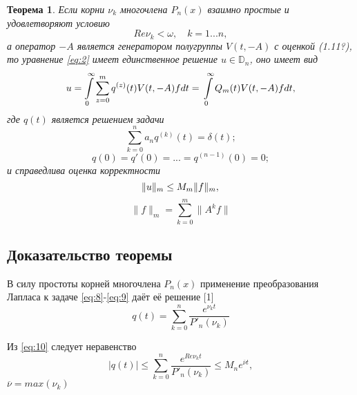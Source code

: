 \documentclass[1244sdpt,a4paper]{article}
\theoremstyle{plain}
\newtheorem{theorem}{Теорема}[section]
\numberwithin{equation}{section}
\begin{document}
\begin{theorem}
    Если корни $\nu_k$ многочлена $P_n(x)$ взаимно простые и удовлетворяют условию
    \begin{equation}
        \label{eq:13}
        Re \nu_k < \omega, \quad k = 1...n,
    \end{equation}
    а оператор $-A$ является генератором полугруппы $V(t, -A)$ с оценкой (1.11?), то уравнение
    \ref{eq:2} имеет единственное решение $u \in \mathbb{D}_n$, оно имеет вид
    \begin{equation}
        u = \int\limits_0^\infty \sum_{z=0}^{m} q^{(z)}(t) V(t, -A) fdt = \\
        \int\limits_0^\infty Q_m (t) V(t, -A)fdt,
    \end{equation}
    где $q(t)$ является решением задачи
    \begin{equation}
        \label{eq:8}
        \sum_{k=0}^{n} a_n q^{(k)}(t) = \delta(t);
    \end{equation}
    \begin{equation}
        \label{eq:9}
        q(0) = q'(0) = ... = q^{(n-1)}(0) = 0;
    \end{equation}
    и справедлива оценка корректности
    \begin{equation}
        \label{eq:15}
        \|u\|_m \le M_m \|f\|_m, \\
    \end{equation}
    \begin{equation*}
        \|f\|_m = \sum_{k=0}^{m} \|A^k f\|
    \end{equation*}
\end{theorem}

\subsection{Доказательство теоремы}

В силу простоты корней многочлена $P_n(x)$ применение преобразования Лапласа к задаче \ref{eq:8}-\ref{eq:9}
даёт её решение [1]
\begin{equation}
    \label{eq:10}
    q(t) = \sum_{k=0}^{n} \frac{e^{\nu_{k}t}}{P'_n(\nu_k)}
\end{equation}

Из \ref{eq:10} следует неравенство
\begin{equation}
    \label{eq:11}
    |q(t)| \le \sum_{k=0}^{n} \frac{e^{Re \nu_k t}}{P'_n(\nu_k)} \le M_n e^{\overline{\nu} t},
\end{equation}
$\overline{\nu} = max(\nu_k)$
\end{document}
